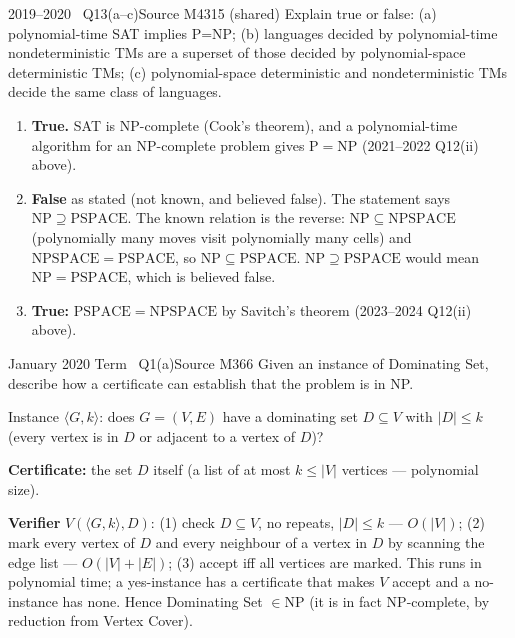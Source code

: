 \documentclass[11pt,a4paper]{article}
\begin{document}
\begin{question}{2019--2020 \textbullet\ Q13(a--c)}{Source M43}{15 (shared)}
Explain true or false: (a) polynomial-time SAT implies P=NP; (b) languages decided by polynomial-time nondeterministic TMs are a superset of those decided by polynomial-space deterministic TMs; (c) polynomial-space deterministic and nondeterministic TMs decide the same class of languages.
\end{question}
\begin{solution}
\begin{enumerate}[label=\textbf{(\alph*)}]
\item \textbf{True.} SAT is NP-complete (Cook's theorem), and a polynomial-time algorithm for an NP-complete problem gives $\mathrm P=\mathrm{NP}$ (2021--2022 Q12(ii) above).
\item \textbf{False} as stated (not known, and believed false). The statement says $\mathrm{NP}\supseteq\mathrm{PSPACE}$. The known relation is the reverse: $\mathrm{NP}\subseteq\mathrm{NPSPACE}$ (polynomially many moves visit polynomially many cells) and $\mathrm{NPSPACE}=\mathrm{PSPACE}$, so $\mathrm{NP}\subseteq\mathrm{PSPACE}$. $\mathrm{NP}\supseteq\mathrm{PSPACE}$ would mean $\mathrm{NP}=\mathrm{PSPACE}$, which is believed false.
\item \textbf{True:} $\mathrm{PSPACE}=\mathrm{NPSPACE}$ by Savitch's theorem (2023--2024 Q12(ii) above).
\end{enumerate}
\end{solution}

\begin{question}{January 2020 Term \textbullet\ Q1(a)}{Source M36}{6}
Given an instance of Dominating Set, describe how a certificate can establish that the problem is in NP.
\end{question}
\begin{solution}
Instance $\langle G,k\rangle$: does $G=(V,E)$ have a dominating set $D\subseteq V$ with $|D|\le k$ (every vertex is in $D$ or adjacent to a vertex of $D$)?

\textbf{Certificate:} the set $D$ itself (a list of at most $k\le|V|$ vertices --- polynomial size).

\textbf{Verifier} $V(\langle G,k\rangle,D)$: (1) check $D\subseteq V$, no repeats, $|D|\le k$ --- $O(|V|)$; (2) mark every vertex of $D$ and every neighbour of a vertex in $D$ by scanning the edge list --- $O(|V|+|E|)$; (3) accept iff all vertices are marked. This runs in polynomial time; a yes-instance has a certificate that makes $V$ accept and a no-instance has none. Hence Dominating Set $\in\mathrm{NP}$ (it is in fact NP-complete, by reduction from Vertex Cover).
\end{solution}
\end{document}
